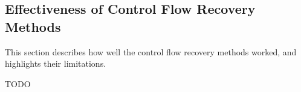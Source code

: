 
\subsection{Effectiveness of Control Flow Recovery Methods}

This section describes how well the control flow recovery methods worked, and highlights their limitations.

TODO
